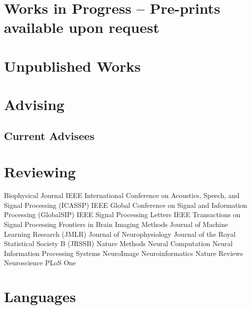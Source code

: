 \documentclass[10pt,colorlinks=true,urlcolor=blue]{moderncv}
\begin{document}
\section{Works in Progress -- Pre-prints available upon request}
\vspace{-15pt}



\section{Unpublished Works}
\vspace{-15pt}

\section{Advising}

\subsection{Current Advisees}



\section{Reviewing}
\cventry {} {Biophysical Journal} {}{}{}{}
\cventry {} {IEEE International Conference on Acoustics, Speech, and Signal Processing (ICASSP)} {}{}{}{}
\cventry {} {IEEE Global Conference on Signal and Information Processing (GlobalSIP)} {} {} {} {}
\cventry {} {IEEE Signal Processing Letters} {} {} {} {} 
\cventry {} {IEEE Transactions on Signal Processing} {}{}{}{}
\cventry {} {Frontiers in Brain Imaging Methods} {}{}{}{}
\cventry {} {Journal of Machine Learning Research (JMLR)} {}{}{}{}
\cventry {} {Journal of Neurophysiology} {}{}{}{}
\cventry {} {Journal of the Royal Statistical Society B (JRSSB)} {}{}{}{}
\cventry {} {Nature Methods} {}{}{}{}
\cventry {} {Neural Computation} {}{}{}{}
\cventry {} {Neural Information Processing Systems} {}{}{}{}
\cventry {} {NeuroImage} {}{}{}{}
\cventry {} {Neuroinformatics} {}{}{}{}
\cventry {} {Nature Reviews Neuroscience} {}{}{}{}
\cventry {} {PLoS One} {}{}{}{}


\section{Languages}
\end{document}
